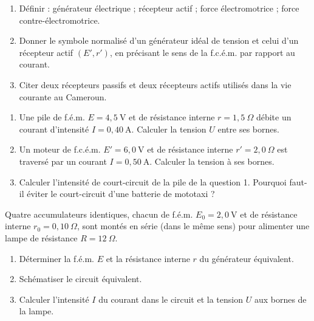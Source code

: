 \documentclass[11pt]{article}
\newcounter{popsec}
\newcounter{popsub}
\newcommand{\courssub}[1]{%
  \stepcounter{popsub}%
  \par\vspace{9pt}\noindent{\popxbold\fontsize{11.5}{13}\selectfont\color{popink}{\color{poporange}\thepopsec.\thepopsub}\hspace{6pt}#1}\par\nopagebreak\vspace{4pt}
}
\begin{document}
\begin{exercice}
\begin{enumerate}
\item Définir : générateur électrique ; récepteur actif ; force électromotrice ; force contre-électromotrice.
\item Donner le symbole normalisé d'un générateur idéal de tension et celui d'un récepteur actif $(E', r')$, en précisant le sens de la f.c.é.m. par rapport au courant.
\item Citer deux récepteurs passifs et deux récepteurs actifs utilisés dans la vie courante au Cameroun.
\end{enumerate}
\end{exercice}

\begin{exercice}
\begin{enumerate}
\item Une pile de f.é.m. $E = 4,5~\text{V}$ et de résistance interne $r = 1,5~\Omega$ débite un courant d'intensité $I = 0,40~\text{A}$. Calculer la tension $U$ entre ses bornes.
\item Un moteur de f.c.é.m. $E' = 6,0~\text{V}$ et de résistance interne $r' = 2,0~\Omega$ est traversé par un courant $I = 0,50~\text{A}$. Calculer la tension à ses bornes.
\item Calculer l'intensité de court-circuit de la pile de la question 1. Pourquoi faut-il éviter le court-circuit d'une batterie de mototaxi ?
\end{enumerate}
\end{exercice}

\courssub{Je m'entraîne}

\begin{exercice}
Quatre accumulateurs identiques, chacun de f.é.m. $E_0 = 2,0~\text{V}$ et de résistance interne $r_0 = 0,10~\Omega$, sont montés en série (dans le même sens) pour alimenter une lampe de résistance $R = 12~\Omega$.
\begin{enumerate}
\item Déterminer la f.é.m. $E$ et la résistance interne $r$ du générateur équivalent.
\item Schématiser le circuit équivalent.
\item Calculer l'intensité $I$ du courant dans le circuit et la tension $U$ aux bornes de la lampe.
\end{enumerate}
\end{exercice}
\end{document}

